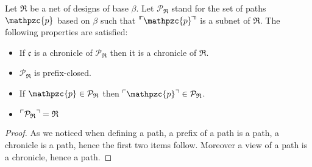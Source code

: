 \documentclass{LMCS}
\newcommand{\chronicle}[1]{{\mathfrak{#1}}}
\newcommand{\design}[1]{{\mathfrak{#1}}}
\newcommand{\pathLL}[1]{\mathpzc{#1}}\newcommand{\strategy}[1]{\pathLL{#1}}\newcommand{\view}[1]{\raisebox{.3ex}{$\ulcorner$}{#1}\raisebox{.3ex}{$\urcorner$}}\newcommand{\fullview}[1]{\raisebox{.3ex}{$\ulcorner\mkern-6mu\ulcorner\mkern-2mu$}{#1}\raisebox{.3ex}{$\mkern-2mu\urcorner\mkern-6mu\urcorner$}}\newcommand{\views}[1]{\view{#1}}\newcommand{\fullviews}[1]{\fullview{#1}}\newcommand{\shuffle}[1]{\llcorner\design{#1}\lrcorner}\newcommand{\PoD}[1]{{\mathcal{P}}_{#1}}\newcommand{\norm}[1]{\llbracket\design{#1}\rrbracket}
\begin{document}
\begin{prop}\label{prop:PathsNet}
 Let $\design{R}$ be a net of designs of base $\beta$. Let
 $\PoD{\design{R}}$ stand for the set of paths $\pathLL{p}$ based on
 $\beta$ such that $\fullview{\pathLL{p}}$ is a subnet of
 $\design{R}$. The following properties are satisfied:
\begin{itemize}[label=$-$]
\item If $\chronicle{c}$ is a chronicle of $\PoD{\design{R}}$ then it is a chronicle of $\design{R}$.
\item $\PoD{\design{R}}$ is prefix-closed.
\item If $\pathLL{p} \in \PoD{\design{R}}$ then $\view{\pathLL{p}} \in \PoD{\design{R}}$.
\item $\views{\PoD{\design{R}}} = \design{R}$
\end{itemize}
\end{prop}
\begin{proof}
As we noticed when defining a path, a prefix of a path is a path, a chronicle is a path, hence the first two items follow. Moreover a view of a path is a chronicle, hence a path.  
\end{proof}
\end{document}
